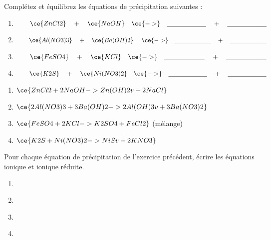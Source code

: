 \documentclass[
  11pt,
  french,
  a4paper,
  openany]{book}
\begin{document}
\begin{Exercise}

Complétez et équilibrez les équations de précipitation suivantes :

\begin{enumerate}
\def\labelenumi{\arabic{enumi}.}
\item
  \(\qquad \ce{ZnCl2} \quad + \quad \ce{NaOH} \quad \ce{->} \quad \underline{\hspace{6em}} \quad + \quad \underline{\hspace{6em}}\)
\item
  \(\qquad \ce{Al(NO3)3} \quad + \quad \ce{Ba(OH)2} \quad \ce{->} \quad \underline{\hspace{6em}} \quad + \quad \underline{\hspace{6em}}\)
\item
  \(\qquad \ce{FeSO4} \quad + \quad \ce{KCl} \quad \ce{->} \quad \underline{\hspace{6em}} \quad + \quad \underline{\hspace{6em}}\)
\item
  \(\qquad \ce{K2S} \quad + \quad \ce{Ni(NO3)2} \quad \ce{->} \quad \underline{\hspace{6em}} \quad + \quad \underline{\hspace{6em}}\)
\end{enumerate}


\end{Exercise}

\begin{Answer}

\begin{enumerate}
\def\labelenumi{\arabic{enumi}.}
\item
  \(\ce{ZnCl2 + 2NaOH -> Zn(OH)2 v + 2NaCl}\)
\item
  \(\ce{ 2Al(NO3)3 + 3Ba(OH)2 -> 2Al(OH)3 v + 3Ba(NO3)2}\)
\item
  \(\ce{FeSO4 + 2KCl -> K2SO4 + FeCl2}\) (mélange)
\item
  \(\ce{K2S + Ni(NO3)2 -> NiS v + 2KNO3}\)
\end{enumerate}

\newpage


\end{Answer}

\begin{Exercise}

Pour chaque équation de précipitation de l'exercice précédent, écrire les équations ionique et ionique réduite.

\begin{enumerate}
\def\labelenumi{\arabic{enumi}.}
\item
  ~
\item
  ~
\item
  ~
\item
  ~
\end{enumerate}


\end{Exercise}
\end{document}

